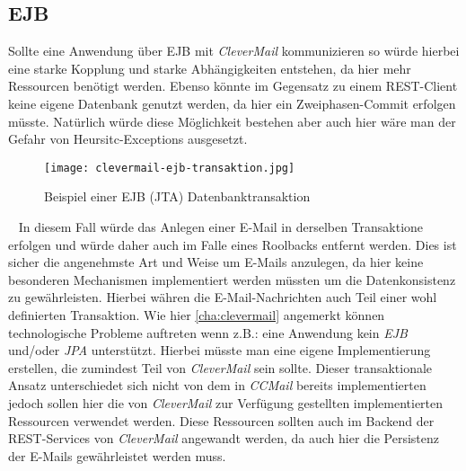 \subsection{EJB}
Sollte eine Anwendung über EJB mit \emph{CleverMail} kommunizieren so würde hierbei eine starke Kopplung und starke Abhängigkeiten entstehen, da hier mehr Ressourcen benötigt werden. Ebenso könnte im Gegensatz zu einem REST-Client keine eigene Datenbank genutzt werden, da hier ein Zweiphasen-Commit erfolgen müsste. Natürlich würde diese Möglichkeit bestehen aber auch hier wäre man der Gefahr von Heursitc-Exceptions ausgesetzt.
\begin{figure}[h]
\centering
\texttt{[image: clevermail-ejb-transaktion.jpg]} %
\caption{Beispiel einer EJB (JTA) Datenbanktransaktion}
\label{fig:clevermail-rest-tcc}
\end{figure}
\ \newline
In diesem Fall würde das Anlegen einer E-Mail in derselben Transaktione erfolgen und würde daher auch im Falle eines Roolbacks entfernt werden. Dies ist sicher die angenehmste Art und Weise um E-Mails anzulegen, da hier keine besonderen Mechanismen implementiert werden müssten um die Datenkonsistenz zu gewährleisten. Hierbei währen die E-Mail-Nachrichten auch Teil einer wohl definierten Transaktion.
\newline
\newline
Wie hier \ref{cha:clevermail} angemerkt können technologische Probleme auftreten wenn z.B.: eine Anwendung kein \emph{EJB} und/oder \emph{JPA} unterstützt. Hierbei müsste man eine eigene Implementierung erstellen, die zumindest Teil von \emph{CleverMail} sein sollte.
\newline
\newline
Dieser transaktionale Ansatz unterschiedet sich nicht von dem in \emph{CCMail} bereits implementierten jedoch sollen hier die von \emph{CleverMail} zur Verfügung gestellten implementierten Ressourcen verwendet werden. Diese Ressourcen sollten auch im Backend der REST-Services von \emph{CleverMail} angewandt werden, da auch hier die Persistenz der E-Mails gewährleistet werden muss. 
\newpage

